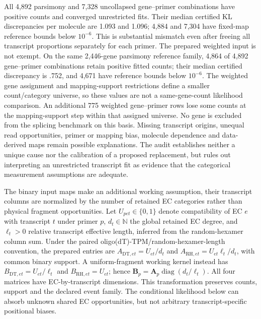 \documentclass[11pt]{article}
\begin{document}
All 4,892 parsimony and 7,328 uncollapsed gene--primer combinations have positive counts and converged unrestricted fits. Their median certified KL discrepancies per molecule are 1.093 and 1.096; 4,884 and 7,304 have fixed-map reference bounds below \(10^{-6}\). This is substantial mismatch even after freeing all transcript proportions separately for each primer. The prepared weighted input is not exempt. On the same 2,446-gene parsimony reference family, 4,864 of 4,892 gene--primer combinations retain positive fitted counts; their median certified discrepancy is .752, and 4,671 have reference bounds below \(10^{-6}\). The weighted gene assignment and mapping-support restrictions define a smaller count/category universe, so these values are not a same-gene-count likelihood comparison. An additional 775 weighted gene--primer rows lose some counts at the mapping-support step within that assigned universe. No gene is excluded from the splicing benchmark on this basis. Missing transcript origins, unequal read opportunities, primer or mapping bias, molecule dependence and data-derived maps remain possible explanations. The audit establishes neither a unique cause nor the calibration of a proposed replacement, but rules out interpreting an unrestricted transcript fit as evidence that the categorical measurement assumptions are adequate.

The binary input maps make an additional working assumption, their transcript columns are normalized by the number of retained EC categories rather than physical fragment opportunities. Let \(U_{pet}\in\{0,1\}\) denote compatibility of EC \(e\) with transcript \(t\) under primer \(p\), \(d_t\in\mathbb N\) the global retained EC degree, and \(\ell_t>0\) relative transcript effective length, inferred from the random-hexamer column sum. Under the paired oligo(dT)-TPM/random-hexamer-length convention, the prepared entries are \(A_{\mathrm{DT},et}=U_{et}/d_t\) and \(A_{\mathrm{RH},et}=U_{et}\ell_t/d_t\), with common binary support. A uniform-fragment working kernel instead has \(B_{\mathrm{DT},et}=U_{et}/\ell_t\) and \(B_{\mathrm{RH},et}=U_{et}\); hence \(\mathbf B_p=\mathbf A_p\operatorname{diag}(d_t/\ell_t)\). All four matrices have EC-by-transcript dimensions. This transformation preserves counts, support and the declared event family. The conditional likelihood below can absorb unknown shared EC opportunities, but not arbitrary transcript-specific positional biases.
\end{document}
